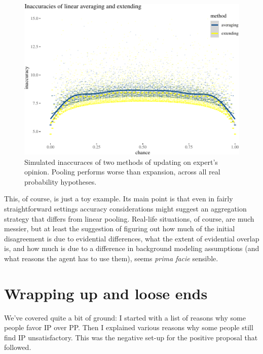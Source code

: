 \documentclass[
  10pt,
  dvipsnames,enabledeprecatedfontcommands]{scrartcl}
\begin{document}
\begin{figure}[H]

\begin{center}\includegraphics[width=1\linewidth]{impreciseEpistemicFINAL_files/figure-latex/fig:inaccuraciesSimulation-1} \end{center}
\caption{Simulated inaccuraces of two methods of updating on expert's opinion. Pooling performs worse than expansion, across all real probability hypotheses.}
\label{fig:inaccuraciesSimulation}
\end{figure}

This, of course, is just a toy example. Its main point is that even in
fairly straightforward settings accuracy considerations might suggest an
aggregation strategy that differs from linear pooling. Real-life
situations, of course, are much messier, but at least the suggestion of
figuring out how much of the initial disagreement is due to evidential
differences, what the extent of evidential overlap is, and how much is
due to a difference in background modeling assumptions (and what reasons
the agent has to use them), seems \emph{prima facie} sensible.

\hypertarget{wrapping-up-and-loose-ends}{%
\section{Wrapping up and loose ends}\label{wrapping-up-and-loose-ends}}

We've covered quite a bit of ground: I started with a list of reasons
why some people favor IP over PP. Then I explained various reasons why
some people still find IP unsatisfactory. This was the negative set-up
for the positive proposal that followed.
\end{document}
